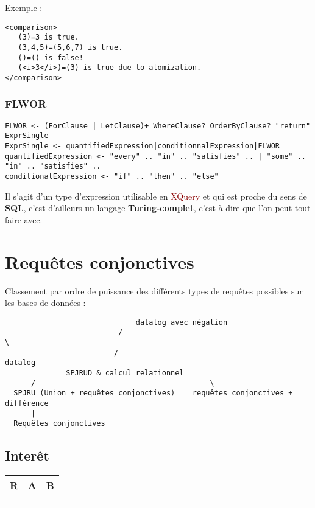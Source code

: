 \documentclass{article}
\newcommand{\red}[1]{\textcolor{darkred}{#1}}
\begin{document}
\noindent\underline{Exemple} : 

\begin{verbatim}
<comparison>
   (3)=3 is true.
   (3,4,5)=(5,6,7) is true.
   ()=() is false!
   (<i>3</i>)=(3) is true due to atomization.
</comparison>
\end{verbatim}

\subsubsection{FLWOR}
\begin{verbatim}
FLWOR <- (ForClause | LetClause)+ WhereClause? OrderByClause? "return" ExprSingle
ExprSingle <- quantifiedExpression|conditionnalExpression|FLWOR
quantifiedExpression <- "every" .. "in" .. "satisfies" .. | "some" .. "in" .. "satisfies" ..
conditionalExpression <- "if" .. "then" .. "else"
\end{verbatim}
Il s'agit d'un type d'expression utilisable en \red{XQuery} et qui est proche du sens de \textbf{SQL}, c'est d'ailleurs un langage \textbf{Turing-complet}, c'est-à-dire que l'on 
peut tout faire avec.

\section{Requêtes conjonctives}

Classement par ordre de puissance des différents types de requêtes possibles sur les bases de données : 
\begin{verbatim}
                              datalog avec négation
                          /                                            \
                         /                                           datalog
              SPJRUD & calcul relationnel
      /                                        \
  SPJRU (Union + requêtes conjonctives)    requêtes conjonctives + différence
      |
  Requêtes conjonctives
\end{verbatim}

\subsection{Interêt}

\begin{center}
	\begin{tabular}{r|cc}
	R&A&B\\
	\hline
	& & \\
	& & \\
	\end{tabular}
\end{center}
\end{document}
